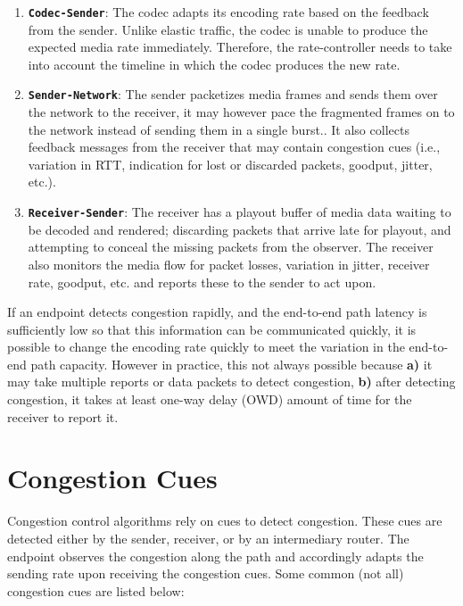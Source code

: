 \begin{enumerate}
\setlength{\itemsep}{0pt}

\item \textbf{\texttt{Codec-Sender}}: The codec adapts its encoding rate based
on the feedback from the sender. Unlike elastic traffic, the codec is unable
to produce the expected media rate immediately. Therefore, the rate-controller
needs to take into account the timeline in which the codec produces the new
rate.

\item \textbf{\texttt{Sender-Network}}: The sender packetizes media frames and
sends them over the network to the receiver, it may however pace the
fragmented frames on to the network instead of sending them in a single
burst.. It also collects feedback messages from the receiver that may contain
congestion cues (i.e., variation in RTT, indication for lost or discarded
packets, goodput, jitter, etc.).

\item \textbf{\texttt{Receiver-Sender}}: The receiver has a playout buffer of
media data waiting to be decoded and rendered; discarding packets that arrive
late for playout, and attempting to conceal the missing packets from the
observer. The receiver also monitors the media flow for packet losses,
variation in jitter, receiver rate, goodput, etc. and reports these to the
sender to act upon.

\end{enumerate}

If an endpoint detects congestion rapidly, and the end-to-end path latency is
sufficiently low so that this information can be communicated quickly, it is
possible to change the encoding rate quickly to meet the variation in the 
end-to-end path capacity. However in practice, this not always possible because
\textbf{a)} it may take multiple reports or data packets to detect congestion,
\textbf{b)} after detecting congestion, it takes at least one-way delay (OWD)
amount of time for the receiver to report it.


\section{Congestion Cues}
\label{fw.cues}

Congestion control algorithms rely on cues to detect congestion. These cues
are detected either by the sender, receiver, or by an intermediary router. The
endpoint observes the congestion along the path and accordingly adapts the
sending rate upon receiving the congestion cues. Some common (not all)
congestion cues are listed below:

